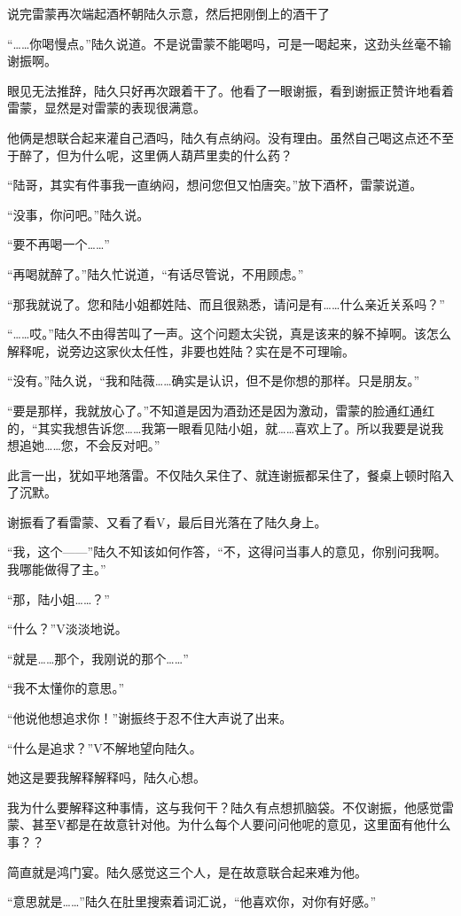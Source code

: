 说完雷蒙再次端起酒杯朝陆久示意，然后把刚倒上的酒干了

“……你喝慢点。”陆久说道。不是说雷蒙不能喝吗，可是一喝起来，这劲头丝毫不输谢振啊。

眼见无法推辞，陆久只好再次跟着干了。他看了一眼谢振，看到谢振正赞许地看着雷蒙，显然是对雷蒙的表现很满意。

他俩是想联合起来灌自己酒吗，陆久有点纳闷。没有理由。虽然自己喝这点还不至于醉了，但为什么呢，这里俩人葫芦里卖的什么药？

“陆哥，其实有件事我一直纳闷，想问您但又怕唐突。”放下酒杯，雷蒙说道。

“没事，你问吧。”陆久说。

“要不再喝一个……”

“再喝就醉了。”陆久忙说道，“有话尽管说，不用顾虑。”

“那我就说了。您和陆小姐都姓陆、而且很熟悉，请问是有……什么亲近关系吗？”

“……哎。”陆久不由得苦叫了一声。这个问题太尖锐，真是该来的躲不掉啊。该怎么解释呢，说旁边这家伙太任性，非要也姓陆？实在是不可理喻。

“没有。”陆久说，“我和陆薇……确实是认识，但不是你想的那样。只是朋友。”

“要是那样，我就放心了。”不知道是因为酒劲还是因为激动，雷蒙的脸通红通红的，“其实我想告诉您……我第一眼看见陆小姐，就……喜欢上了。所以我要是说我想追她……您，不会反对吧。”

此言一出，犹如平地落雷。不仅陆久呆住了、就连谢振都呆住了，餐桌上顿时陷入了沉默。

谢振看了看雷蒙、又看了看V，最后目光落在了陆久身上。

“我，这个——”陆久不知该如何作答，“不，这得问当事人的意见，你别问我啊。我哪能做得了主。”

“那，陆小姐……？”

“什么？”V淡淡地说。

“就是……那个，我刚说的那个……”

“我不太懂你的意思。”

“他说他想追求你！”谢振终于忍不住大声说了出来。

“什么是追求？”V不解地望向陆久。

她这是要我解释解释吗，陆久心想。

我为什么要解释这种事情，这与我何干？陆久有点想抓脑袋。不仅谢振，他感觉雷蒙、甚至V都是在故意针对他。为什么每个人要问问他呢的意见，这里面有他什么事？？

简直就是鸿门宴。陆久感觉这三个人，是在故意联合起来难为他。

“意思就是……”陆久在肚里搜索着词汇说，“他喜欢你，对你有好感。”

